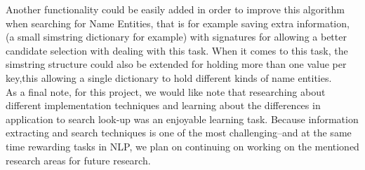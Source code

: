 Another functionality could be easily added in order to improve this algorithm when searching for Name Entities,
that is for example saving extra information, (a small simstring dictionary for example) with signatures for allowing a better candidate selection with dealing with this task.
When it comes to this task, the simstring structure could also be extended for holding more than one value per key,this  allowing a single dictionary to hold different kinds of name entities.\\

As a final note, for this project, we would like note that researching about different implementation techniques and learning about the differences in application to search look-up was an enjoyable learning task. Because information extracting and search techniques is one of the most challenging--and at the same time rewarding tasks in NLP, we plan on continuing on working on the mentioned research areas for future research.